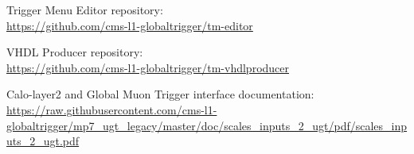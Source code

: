 \documentclass[11pt,a4paper,english,titlepage]{article}
\begin{document}
\doctitlepage{}



\doctoc{}





\doctables{}

\docfigures{}

% 

\begin{thebibliography}{00}

Trigger Menu Editor repository:\\
\url{https://github.com/cms-l1-globaltrigger/tm-editor}

VHDL Producer repository:\\
\url{https://github.com/cms-l1-globaltrigger/tm-vhdlproducer}

Calo-layer2 and Global Muon Trigger interface documentation:\\
\url{https://raw.githubusercontent.com/cms-l1-globaltrigger/mp7_ugt_legacy/master/doc/scales_inputs_2_ugt/pdf/scales_inputs_2_ugt.pdf}

\end{thebibliography}

\end{document}
